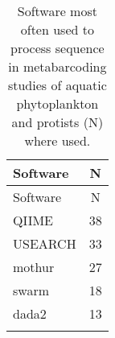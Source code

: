 \begin{longtable}{lc}
\caption{Software most often used to process sequence in metabarcoding studies of aquatic phytoplankton and protists (N) where used.} \\ 
  \hline
  Software & N \\
 \endfirsthead 
 \hline 
 Software & N \\
 \hline 
 \endhead 
 \hline 
 \endfoot 
  \endlastfoot 
 \hline
QIIME & 38 \\ 
  USEARCH & 33 \\ 
  mothur & 27 \\ 
  swarm & 18 \\ 
  dada2 & 13 \\ 
   \hline
\hline
\label{tab:method}
\end{longtable}
